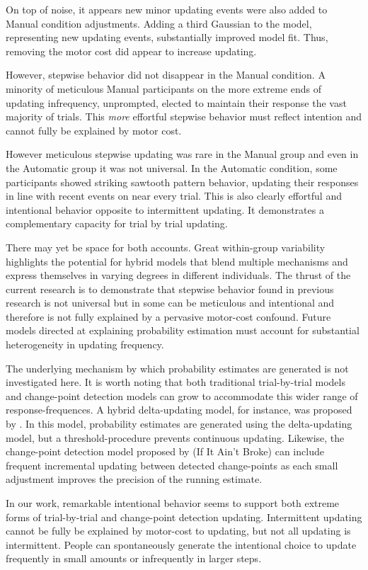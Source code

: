 \documentclass[sn-apa]{sn-jnl}\usepackage[]{graphicx}\usepackage[]{xcolor}
\begin{document}
On top of noise, it appears new minor updating events were also added to Manual condition adjustments. Adding a third Gaussian to the model, representing new updating events, substantially improved model fit. Thus, removing the motor cost did appear to increase updating.

However, stepwise behavior did not disappear in the Manual condition. A minority of meticulous Manual participants on the more extreme ends of updating infrequency, unprompted, elected to maintain their response the vast majority of trials. This \emph{more} effortful stepwise behavior must reflect intention and cannot fully be explained by motor cost. 

However meticulous stepwise updating was rare in the Manual group and even in the Automatic group it was not universal. In the Automatic condition, some participants showed striking sawtooth pattern behavior, updating their responses in line with recent events on near every trial. This is also clearly effortful and intentional behavior opposite to intermittent updating. It demonstrates a complementary capacity for trial by trial updating.

There may yet be space for both accounts. Great within-group variability highlights the potential for hybrid models that blend multiple mechanisms and express themselves in varying degrees in different individuals. The thrust of the current research is to demonstrate that stepwise behavior found in previous research is not universal but in some can be meticulous and intentional and therefore is not fully explained by a pervasive motor-cost confound. Future models directed at explaining probability estimation must account for substantial heterogeneity in updating frequency. 

The underlying mechanism by which probability estimates are generated is not investigated here. It is worth noting that both traditional trial-by-trial models and change-point detection models can grow to accommodate this wider range of response-frequences. A hybrid delta-updating model, for instance, was proposed by \cite{forsgren2023further}. In this model, probability estimates are generated using the delta-updating model, but a threshold-procedure prevents continuous updating. Likewise, the change-point detection model proposed by \cite{gallistel2014} (If It Ain't Broke) can include frequent incremental updating between detected change-points as each small adjustment improves the precision of the running estimate.

In our work, remarkable intentional behavior seems to support both extreme forms of trial-by-trial and change-point detection updating. Intermittent updating cannot be fully be explained by motor-cost to updating, but not all updating is intermittent. People can spontaneously generate the intentional choice to update frequently in small amounts or infrequently in larger steps.
\end{document}
